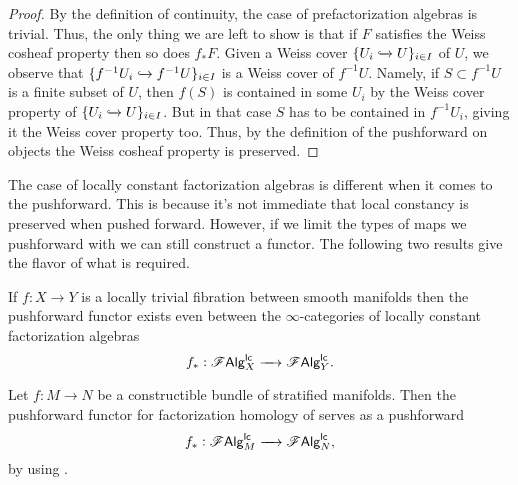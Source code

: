 \documentclass[../text]{subfiles}
\begin{document}
\begin{proof}
    By the definition of continuity, the case of prefactorization algebras is trivial. Thus, the only thing we are left to show is that if $F$ satisfies the Weiss cosheaf property then so does $f_* F$. Given a Weiss cover $\{U_i \xhookrightarrow{} U\}_{i \in I}$ of $U$, we observe that $\{f^{-1}U_i \xhookrightarrow{} f^{-1}U\}_{i \in I}$ is a Weiss cover of $f^{-1}U$. Namely, if $S \subset f^{-1}U$ is a finite subset of $U$, then $f(S)$ is contained in some $U_i$ by the Weiss cover property of $\{U_i \xhookrightarrow{} U\}_{i \in I}$. But in that case $S$ has to be contained in $f^{-1}U_i$, giving it the Weiss cover property too. Thus, by the definition of the pushforward on objects the Weiss cosheaf property is preserved.
\end{proof}

The case of locally constant factorization algebras is different when it comes to the pushforward. This is because it's not immediate that local constancy is preserved when pushed forward. However, if we limit the types of maps we pushforward with we can still construct a functor. The following two results give the flavor of what is required.

\begin{proposition}
    If $f: X \rightarrow Y$ is a locally trivial fibration between smooth manifolds then the pushforward functor exists even between the $\infty$-categories of locally constant factorization algebras
    \begin{equation}
        f_*: \mathscr{F} \mathsf{Alg}^{\mathsf{lc}}_X \xrightarrow{\quad} \mathscr{F} \mathsf{Alg}^{\mathsf{lc}}_Y.
    \end{equation}
\end{proposition}

\begin{corollary}\label{cor:pushforward_for_lc}
    Let $f: M \xrightarrow{} N$ be a constructible bundle of stratified manifolds. Then the pushforward functor for factorization homology of  serves as a pushforward
    \begin{equation}
        f_*: \mathscr{F} \mathsf{Alg}^{\mathsf{lc}}_M \xrightarrow{\quad} \mathscr{F} \mathsf{Alg}^{\mathsf{lc}}_N,
    \end{equation}
    by using .
\end{corollary}
\end{document}
